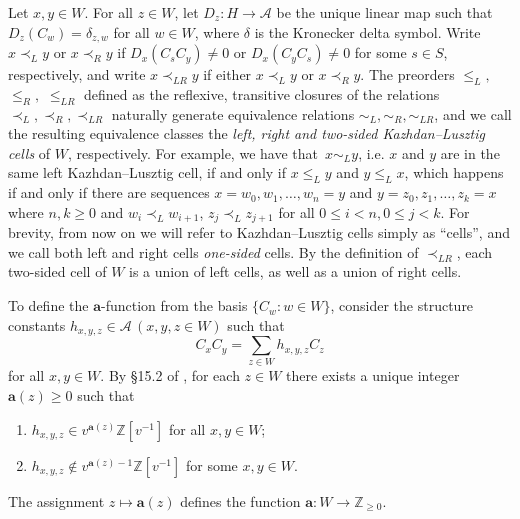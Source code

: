 \documentclass[ALCO,Unicode,published]{cedram}
\newcommand{\Z}{\mathbb{Z}}
\newcommand{\cala}{\mathcal{A}}
\newcommand{\la}{\mathbf{a}}
\newcommand{\ra}{\rightarrow}
\newcommand{\inverse}{^{-1}}
\begin{document}
Let $x,y\in W$. For all $z\in W$, let $D_z: H\ra\cala$ be the unique linear map such that
$D_z(C_w)=\delta_{z,w}$ for all $w\in W$, where $\delta$ is the Kronecker delta symbol.  Write~$x\prec_L y$ 
or $x\prec_R y$ if $D_x(C_sC_y)\neq 0$ or $D_{x}(C_yC_s)\neq 0$ for some $s\in S$,
respectively, and write $x\prec_{LR}y$ if either $x\prec_L y$ or $x\prec_R y$.  The preorders
$\le_L,$ $\le_R,$ $\le_{LR}$ defined as the reflexive, transitive closures of the relations
$\prec_L,\prec_R, \prec_{LR}$ naturally generate equivalence relations $\sim_L, \sim_R, \sim_{LR}$,
and we call the resulting equivalence classes the  \emph{left, right and two-sided Kazhdan--Lusztig
cells} of $W$, respectively.  For example, we have that~$x\sim_L y$, i.e. $x$ and $y$ are in the same
left Kazhdan--Lusztig cell, if and only if $x\le_L y$ and $y\le_L x$, which happens if and only if
there are sequences $x=w_0,w_1,\dots, w_n=y$ and $y=z_0,z_1,\dots, z_k=x$ where $n,k\ge 0$ and
$w_i\prec_L w_{i+1}$, $z_j\prec_L z_{j+1}$ for all $0\le i<n, 0\le j<k$.  For brevity, from now on we
will refer to Kazhdan--Lusztig cells simply as ``cells'', and we call both left and right cells
\emph{one-sided} cells. By the definition of $\prec_{LR}$, each two-sided cell of $W$ is a union of
left cells, as well as a union of right cells. 

To define the $\la$-function from the basis $\{C_w:w\in W\}$, consider the structure constants
$h_{x,y,z}\in \cala \, (x,y,z\in W)$ such that 
\begin{equation}
    \label{eq:h} C_x C_y =\sum_{z\in W} h_{x,y,z} C_z 
\end{equation} for all $x,y\in W$. By \S 15.2 of \cite{LusztigHecke}, for each $z\in W$ there exists
    a unique integer $\la(z)\ge 0$ such that 
\begin{enumerate}
    \item[(a)] $h_{x,y,z}\in v^{\la(z)}\Z[v\inverse]$ for all $x,y\in W$;
    \item[(b)] $h_{x,y,z}\notin v^{\la(z)-1}\Z[v\inverse]$ for some $x,y\in W$. 
\end{enumerate} The assignment $z\mapsto \la(z)$ defines the function $\la: W\ra \Z_{\ge 0}$.
\end{document}
